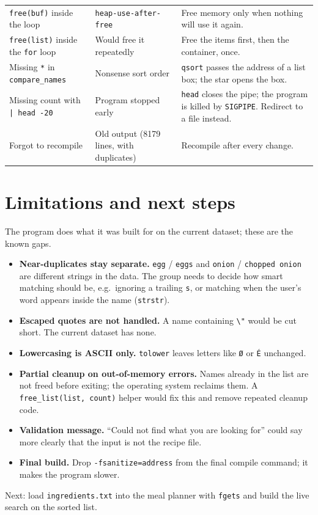 \documentclass[11pt,a4paper]{article}
\newcommand{\code}[1]{\texttt{#1}}
\begin{document}
\begin{center}
\begin{tabularx}{\textwidth}{@{}>{\raggedright\arraybackslash}p{} L L@{}}
\code{free(buf)} inside the loop
  & \code{heap-use-after-free}
  & Free memory only when nothing will use it again. \\
\code{free(list)} inside the \code{for} loop
  & Would free it repeatedly
  & Free the items first, then the container, once. \\
Missing \code{*} in \code{compare\_names}
  & Nonsense sort order
  & \code{qsort} passes the address of a list box; the star opens the box. \\
Missing count with \code{| head -20}
  & Program stopped early
  & \code{head} closes the pipe; the program is killed by \code{SIGPIPE}.
    Redirect to a file instead. \\
Forgot to recompile
  & Old output (8179 lines, with duplicates)
  & Recompile after every change. \\
\bottomrule
\end{tabularx}
\end{center}

\section{Limitations and next steps}

The program does what it was built for on the current dataset; these are the
known gaps.

\begin{itemize}[leftmargin=*, itemsep=0.4em]
  \item \textbf{Near-duplicates stay separate.} \code{egg} / \code{eggs} and
    \code{onion} / \code{chopped onion} are different strings in the data. The
    group needs to decide how smart matching should be, e.g.\ ignoring a
    trailing \code{s}, or matching when the user's word appears inside the name
    (\code{strstr}).
  \item \textbf{Escaped quotes are not handled.} A name containing
    \code{\textbackslash"} would be cut short. The current dataset has none.
  \item \textbf{Lowercasing is ASCII only.} \code{tolower} leaves letters like
    \code{Ø} or \code{É} unchanged.
  \item \textbf{Partial cleanup on out-of-memory errors.} Names already in the
    list are not freed before exiting; the operating system reclaims them. A
    \code{free\_list(list, count)} helper would fix this and remove repeated
    cleanup code.
  \item \textbf{Validation message.} ``Could not find what you are looking
    for'' could say more clearly that the input is not the recipe file.
  \item \textbf{Final build.} Drop \code{-fsanitize=address} from the final
    compile command; it makes the program slower.
\end{itemize}

Next: load \code{ingredients.txt} into the meal planner with \code{fgets} and
build the live search on the sorted list.
\end{document}
